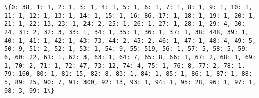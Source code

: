 \documentclass[11pt]{article}
\begin{document}
    \begin{Verbatim}[commandchars=\\\{\}]
\{0: 38, 1: 1, 2: 1, 3: 1, 4: 1, 5: 1, 6: 1, 7: 1, 8: 1, 9: 1, 10: 1, 11: 1, 12: 1, 13: 1, 14: 1, 15: 1, 16: 86, 17: 1, 18: 1, 19: 1, 20: 1, 21: 1, 22: 13, 23: 1, 24: 2, 25: 1, 26: 1, 27: 1, 28: 1, 29: 4, 30: 24, 31: 2, 32: 3, 33: 1, 34: 1, 35: 1, 36: 1, 37: 1, 38: 448, 39: 1, 40: 1, 41: 1, 42: 1, 43: 73, 44: 2, 45: 2, 46: 1, 47: 1, 48: 4, 49: 5, 50: 9, 51: 2, 52: 1, 53: 1, 54: 9, 55: 519, 56: 1, 57: 5, 58: 5, 59: 6, 60: 22, 61: 1, 62: 3, 63: 1, 64: 7, 65: 8, 66: 1, 67: 2, 68: 1, 69: 1, 70: 2, 71: 1, 72: 47, 73: 12, 74: 4, 75: 1, 76: 8, 77: 2, 78: 1, 79: 160, 80: 1, 81: 15, 82: 8, 83: 1, 84: 1, 85: 1, 86: 1, 87: 1, 88: 5, 89: 25, 90: 7, 91: 300, 92: 13, 93: 1, 94: 1, 95: 28, 96: 1, 97: 1, 98: 3, 99: 1\}

    \end{Verbatim}
\end{document}
